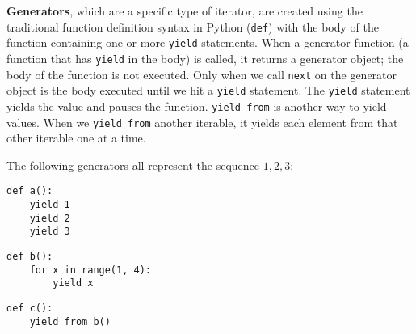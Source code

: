 \textbf{Generators}, which are a specific type of iterator, are created using the traditional function definition syntax in Python (\lstinline{def}) with the body of the function containing one or more \lstinline{yield} statements. When a generator function (a function that has \lstinline{yield} in the body) is called, it returns a generator object; the body of the function is not executed. Only when we call \lstinline{next} on the generator object is the body executed until we hit a \lstinline{yield} statement. The \lstinline{yield} statement yields the value and pauses the function. \lstinline{yield from} is another way to yield values. When we \lstinline{yield from} another iterable, it yields each element from that other iterable one at a time. 

The following generators all represent the sequence $1,2,3$: 

\begin{minipage}[t]{0.2\textwidth}
\begin{lstlisting}
def a():
    yield 1
    yield 2
    yield 3
\end{lstlisting}
\end{minipage}
\begin{minipage}[t]{0.4\textwidth}
\begin{lstlisting}
def b():
    for x in range(1, 4):
        yield x
\end{lstlisting}
\end{minipage}
\begin{minipage}[t]{0.4\textwidth}
\begin{lstlisting}
def c():
    yield from b()
\end{lstlisting}
\end{minipage}

